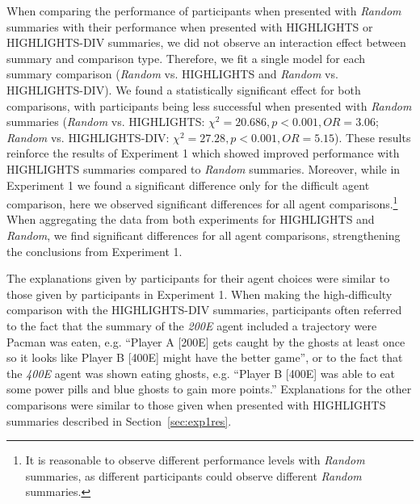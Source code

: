 When comparing the performance of participants when presented with \emph{Random} summaries with their performance when presented with HIGHLIGHTS or HIGHLIGHTS-DIV summaries, we did not observe an interaction effect between summary and comparison type. Therefore, we fit a single model for each summary comparison (\emph{Random} vs. HIGHLIGHTS and \emph{Random} vs. HIGHLIGHTS-DIV). We found a statistically significant effect for both comparisons, with participants being less successful when presented with \emph{Random} summaries (\emph{Random} vs. HIGHLIGHTS: $\chi^2=20.686, p<0.001, OR = 3.06$; \emph{Random} vs. HIGHLIGHTS-DIV: $\chi^2=27.28, p<0.001, OR = 5.15$). These results reinforce the results of Experiment 1 which showed improved performance with HIGHLIGHTS summaries compared to \emph{Random} summaries. Moreover, while in Experiment 1 we  found a significant difference only for the difficult agent comparison, here we observed significant differences for all agent comparisons.\footnote{It is reasonable to observe different performance levels with \emph{Random} summaries, as different participants could observe different \emph{Random} summaries.} When aggregating the data from both experiments for HIGHLIGHTS and \emph{Random}, we find significant differences for all agent comparisons, strengthening the conclusions from Experiment 1. 

The explanations given by participants for their agent choices were similar to those given by participants in Experiment 1. When making the high-difficulty comparison with the HIGHLIGHTS-DIV summaries, participants often referred to the fact that the summary of the \emph{200E} agent included a trajectory were Pacman was eaten, e.g. ``Player A [200E] gets caught by the ghosts at least once so it looks like Player B [400E] might have the better game'', or to the fact that the \emph{400E} agent was shown eating ghosts, e.g. ``Player B [400E] was able to eat some power pills and blue ghosts to gain more points.'' Explanations for the other comparisons were similar to those given when presented with HIGHLIGHTS summaries described in Section~\ref{sec:exp1res}.

